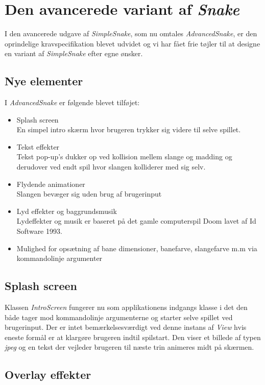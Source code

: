 \documentclass[]{article}
\begin{document}
\section{Den avancerede variant af \textit{Snake}}

I den avancerede udgave af \textit{SimpleSnake}, som nu omtales \textit{AdvancedSnake}, er den oprindelige kravspecifikation blevet udvidet og vi har fået frie tøjler til at designe en variant af \textit{SimpleSnake} efter egne ønsker. 

\subsection{Nye elementer}
I \textit{AdvancedSnake} er følgende blevet tilføjet:
\begin{itemize}
	\item Splash screen \\
	En simpel intro skærm hvor brugeren trykker sig videre til selve spillet.
	\item Tekst effekter \\
	Tekst pop-up's dukker op ved kollision mellem slange og madding og derudover ved endt spil hvor slangen kolliderer med sig selv.
	\item Flydende animationer \\
	Slangen bevæger sig uden brug af brugerinput
	\item Lyd effekter og baggrundsmusik \\
	Lydeffekter og musik er baseret på det gamle computerspil Doom lavet af Id Software 1993.
	\item Mulighed for opsætning af bane dimensioner, banefarve, slangefarve m.m via kommandolinje argumenter
	
\end{itemize}
	
	\subsection{Splash screen}
	
	Klassen \textit{IntroScreen} fungerer nu som applikationens indgangs klasse i det den både tager mod kommandolinje argumenterne og starter selve spillet ved brugerinput. Der er intet bemærkelsesværdigt ved denne instans af \textit{View} hvis eneste formål er at klargøre brugeren indtil spilstart. Den viser et billede af typen \textit{jpeg} og en tekst der vejleder brugeren til næste trin animeres midt på skærmen.
	
	\subsection{Overlay effekter}
	
\end{document}
